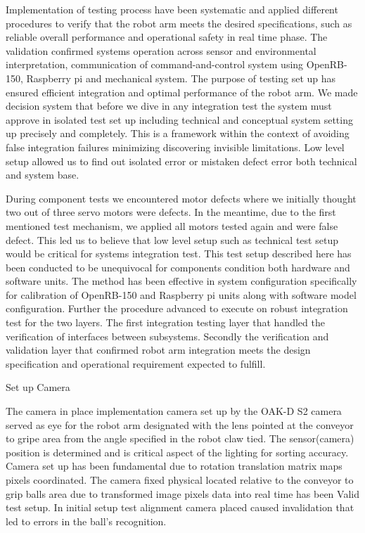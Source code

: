 
Implementation of testing process have been systematic and applied different procedures to verify that the robot arm meets the desired specifications, such as reliable overall performance and operational safety in real time phase. The validation confirmed systems operation across sensor and environmental interpretation, communication of command-and-control system using OpenRB-150, Raspberry pi and mechanical system. The purpose of testing set up has ensured efficient integration and optimal performance of the robot arm. We made decision system that before we dive in any integration test the system must approve in isolated test set up including technical and conceptual system setting up precisely and completely. This is a framework within the context of avoiding false integration failures minimizing discovering invisible limitations. Low level setup allowed us to find out isolated error or mistaken defect error both technical and system base.




During component tests we encountered motor defects where we initially thought two out of three servo motors were defects. In the meantime, due to the first mentioned test mechanism, we applied all motors tested again and were false defect. This led us to believe that low level setup such as technical test setup would be critical for systems integration test. This test setup described here has been conducted to be unequivocal for components condition both hardware and software units. The method has been effective in system configuration specifically for calibration of OpenRB-150 and Raspberry pi units along with software model configuration. Further the procedure advanced to execute on robust integration test for the two layers. The first integration testing layer that handled the verification of interfaces between subsystems. Secondly the verification and validation layer that confirmed robot arm integration meets the design specification and operational requirement expected to fulfill. 



Set up Camera 

The camera in place implementation camera set up by the OAK-D S2 camera served as eye for the robot arm designated with the lens pointed at the conveyor to gripe area from the angle specified in the robot claw tied. The sensor(camera) position is determined and is critical aspect of the lighting for sorting accuracy. Camera set up has been fundamental due to rotation translation matrix maps pixels coordinated. The camera fixed physical located relative to the conveyor to grip balls area due to transformed image pixels data into real time has been Valid test setup. In initial setup test alignment camera placed caused invalidation that led to errors in the ball’s recognition. 



